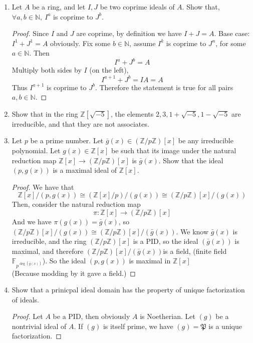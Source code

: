 \documentclass[hidelinks,12pt]{article}
\newcommand{\N}{\mathbb{N}}
\newcommand{\Z}{\mathbb{Z}}
\newcommand{\F}{\mathbb{F}}
\newcommand{\gothp}{\mathfrak{P}}
\begin{document}
\begin{enumerate}
\begin{proof}
            \[
                k=a+b\cdot \frac{2+i}{5}=a+\frac{2b}{5}+\frac{bi}{5}
            \]
            for some \(a,b\in\Z\). Since \(k=\frac{p}{q}\) is strictly real, we must have
            \[
                \frac{bi}{5}=0\implies b=0
            \]
             But then \(k=a+0\in\Z\) contradiction.\\
            Similarly, write \(k=a+b\cdot \frac{2-i}{5}=a+\frac{2b}{5}-\frac{bi}{5}\) so \(\frac{bi}{5}=0\implies b=0\) so \(k\in\Z\).
        \end{proof}
    \item Let \(A\) be a ring, and let \(I,J\) be two coprime ideals of \(A\). Show that, \(\forall a,b\in\N,\ I^{a}\) is coprime to \(J^{b}\).
        \begin{proof}
            Since \(I\) and \(J\) are coprime, by definition we have \(I+J=A\). Base case: \(I^{1}+J^{1}=A\) obviously. Fix some \(b\in\N\), assume \(I^{k}\) is coprime to \(J^{n}\), for some \(a\in\N\). Then
            \[
                I^{a}+J^{b}=A
            \]
            Multiply both sides by \(I\) (on the left), \[
            I^{a+1}+J^{b}=IA=A
            \]
            Thus \(I^{a+1}\) is coprime to \(J^{b}\). Therefore the statement is true for all pairs \(a,b\in\N\).
        \end{proof}
    \item Show that in the ring \(\Z[\sqrt{-5}]\), the elements \(2,3,1+\sqrt{-5},1-\sqrt{-5}\) are irreducible, and that they are not associates.
    \item Let \(p\) be a prime number. Let \(\bar{g}(x)\in(\Z/p\Z)[x]\) be any irreducible polynomial. Let \(g(x)\in\Z[x]\) be such that its image under the natural reduction map \(\Z[x]\to(\Z/p\Z)[x]\) is \(\bar{g}(x)\). Show that the ideal \((p,g(x))\) is a maximal ideal of \(\Z[x]\).
        \begin{proof}
            We have that \[
                \Z[x]/(p,g(x))\cong(\Z[x]/p)/(g(x))\cong(\Z/p\Z)[x]/(g(x))
            \]
            Then, consider the natural reduction map
            \[
                \pi:\Z[x]\to(\Z/p\Z)[x]
            \]
            And we have \(\pi(g(x))=\bar{g}(x)\), so \((\Z/p\Z)[x]/(g(x))\cong(\Z/p\Z)[x]/(\bar{g}(x))\). We know \(\bar{g}(x)\) is irreducible, and the ring \((\Z/p\Z)[x]\) is a PID, so the ideal \((\bar{g}(x))\) is maximal, and therefore \((\Z/p\Z)[x]/(\bar{g}(x))\)is a field, (finite field \(\F_{p^{\deg(\bar{g}(x))}}\)). So the ideal \((p,g(x))\) is maximal in \(\Z[x]\)\\
            (Because modding by it gave a field.)
        \end{proof}
    \item Show that a prinicpal ideal domain has the property of unique factorization of ideals.
        \begin{proof}
        Let \(A\) be a PID, then obviously \(A\) is Noetherian. Let \((g)\) be a nontrivial ideal of \(A\). If \((g)\) is itself prime, we have \((g)=\gothp\) is a unique factorization.
        \end{proof}
\end{enumerate}
\end{document}
